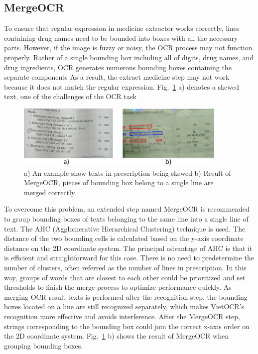 \subsection{MergeOCR}
To ensure that regular expression in medicine extractor works correctly, lines containing drug names need to be bounded into boxes with all the necessary parts. However, if the image is fuzzy or noisy, the OCR process may not function properly. Rather of a single bounding box including all of digits, drug names, and drug ingredients, OCR generates numerous bounding boxes containing the separate components As a result, the extract medicine step may not work because it does not match the regular expression. Fig.~\ref{fig_merge} a) denotes a skewed text, one of the challenges of the OCR task
\begin{figure}
\centering
\includegraphics[width=0.9\textwidth]{method/merge_grouped.png}
\caption{a) An example show texts in prescription being skewed b) Result of MergeOCR, pieces of bounding box belong to a single line are merged correctly}
\label{fig_merge}
\end{figure}

To overcome this problem, an extended step named MergeOCR is recommended to group bounding boxes of texts belonging to the same line into a single line of text. %
The AHC (Agglomerative Hierarchical Clustering) technique is used. The distance of the two bounding cells is calculated based on the y-axis coordinate distance on the 2D coordinate system. The principal advantage of AHC is that it is efficient and straightforward for this case. There is no need to predetermine the number of clusters, often referred as the number of lines in prescription. 
In this way, groups of words that are closest to each other could be prioritized and set thresholds to finish the merge process to optimize performance quickly. As merging OCR result texts is performed after the recognition step, the bounding boxes located on a line are still recognized separately, which makes VietOCR's recognition more effective and avoids interference. After the MergeOCR step, strings corresponding to the bounding box could join the correct x-axis order on the 2D coordinate system. %
Fig.~\ref{fig_merge} b) shows the result of MergeOCR when grouping bounding boxes.
